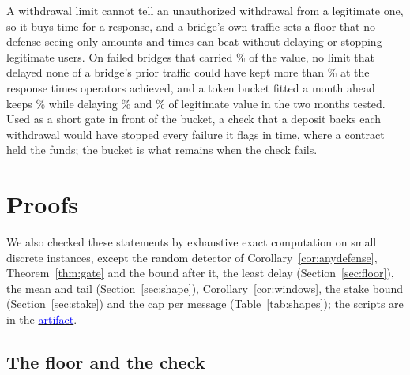 \documentclass[conference,compsoc]{IEEEtran}
\newcommand{\artifactlink}[1]{\texorpdfstring{\href{https://github.com/submissionrepo/buying-time-artifact}{\textcolor{blue}{#1}}}{#1}}
\numberwithin{equation}{section}
\theoremstyle{plain}
\theoremstyle{definition}
\theoremstyle{remark}
\begin{document}
A withdrawal limit cannot tell an unauthorized withdrawal from a legitimate one, so it buys time for a response, and a bridge's own traffic sets a floor that no defense seeing only amounts and times can beat without delaying or stopping legitimate users. On \pbNWords{} failed bridges that carried \pbValueSharePct\% of the value, no limit that delayed none of a bridge's prior traffic could have kept more than \pbFloorPctR\% at the response times operators achieved, and a token bucket fitted a month ahead keeps \pbBucketPctR\% while delaying \pbBucketDelayedPct\% and \pbBucketDelayedTwoPct\% of legitimate value in the two months tested. Used as a short gate in front of the bucket, a check that a deposit backs each withdrawal would have stopped every failure it flags in time, where a contract held the funds; the bucket is what remains when the check fails.




\appendices



\section{Proofs}\label{app:proofs}

We also checked these statements by exhaustive exact computation on small discrete instances, except the random detector of Corollary~\ref{cor:anydefense}, Theorem~\ref{thm:gate} and the bound after it, the least delay (Section~\ref{sec:floor}), the mean and tail (Section~\ref{sec:shape}), Corollary~\ref{cor:windows}, the stake bound (Section~\ref{sec:stake}) and the cap per message (Table~\ref{tab:shapes}); the scripts are in the \artifactlink{artifact}.

\subsection{The floor and the check}\label{app:floorproof}
\end{document}
